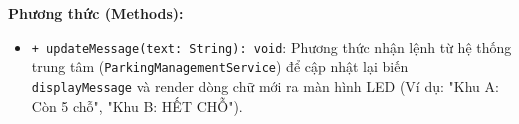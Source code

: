 \noindent\textbf{Phương thức (Methods):}
\begin{itemize}
    \item \texttt{+ updateMessage(text: String): void}: Phương thức nhận lệnh từ hệ thống trung tâm (\texttt{ParkingManagementService}) để cập nhật lại biến \texttt{displayMessage} và render dòng chữ mới ra màn hình LED (Ví dụ: "Khu A: Còn 5 chỗ", "Khu B: HẾT CHỖ").
\end{itemize}